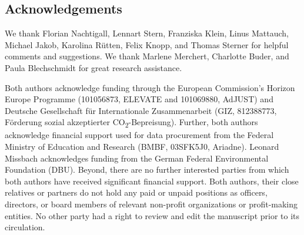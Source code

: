 \documentclass[12pt, a4paper]{article}
\begin{document}
\subsection{Acknowledgements} \label{acknowledgements}

We thank Florian Nachtigall, Lennart Stern, Franziska Klein, Linus Mattauch, Michael Jakob, Karolina Rütten, Felix Knopp, and Thomas Sterner for helpful comments and suggestions. 
We thank Marlene Merchert, Charlotte Buder, and Paula Blechschmidt for great research assistance. 

Both authors acknowledge funding through the European Commission’s Horizon Europe Programme (101056873, ELEVATE and 101069880, AdJUST) and Deutsche Gesellschaft für Internationale Zusammenarbeit (GIZ, 812388773, Förderung sozial akzeptierter CO\textsubscript{2}-Bepreisung). Further, both authors acknowledge financial support used for data procurement from the Federal Ministry of Education and Research (BMBF, 03SFK5J0, Ariadne). Leonard Missbach acknowledges funding from the German Federal Environmental Foundation (DBU). Beyond, there are no further interested parties from which both authors have received significant financial support. Both authors, their close relatives or partners do not hold any paid or unpaid positions as officers, directors, or board members of relevant non-profit organizations or profit-making entities. No other party had a right to review and edit the manuscript prior to its circulation.


\end{document}
